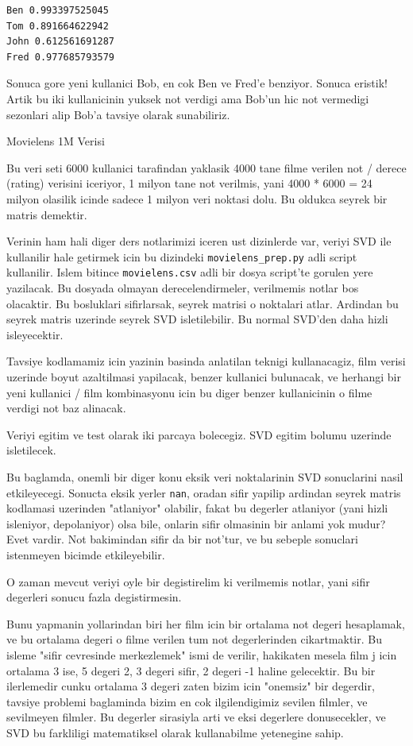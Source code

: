 \documentclass[12pt,fleqn]{article}\usepackage{../common}
\begin{document}
\begin{verbatim}
Ben 0.993397525045
Tom 0.891664622942
John 0.612561691287
Fred 0.977685793579
\end{verbatim}

Sonuca gore yeni kullanici Bob, en cok Ben ve Fred'e benziyor. Sonuca
eristik! Artik bu iki kullanicinin yuksek not verdigi ama Bob'un hic
not vermedigi sezonlari alip Bob'a tavsiye olarak sunabiliriz.

Movielens 1M Verisi

Bu veri seti 6000 kullanici tarafindan yaklasik 4000 tane filme
verilen not / derece (rating) verisini iceriyor, 1 milyon tane not
verilmis, yani 4000 * 6000 = 24 milyon olasilik icinde sadece 1 milyon
veri noktasi dolu. Bu oldukca seyrek bir matris demektir.

Verinin ham hali diger ders notlarimizi iceren ust dizinlerde var, veriyi
SVD ile kullanilir hale getirmek icin bu dizindeki \verb!movielens_prep.py!
adli script kullanilir. Islem bitince \verb!movielens.csv! adli bir dosya
script'te gorulen yere yazilacak. Bu dosyada olmayan derecelendirmeler,
verilmemis notlar bos olacaktir. Bu bosluklari sifirlarsak, seyrek matrisi
o noktalari atlar. Ardindan bu seyrek matris uzerinde seyrek SVD
isletilebilir. Bu normal SVD'den daha hizli isleyecektir.

Tavsiye kodlamamiz icin yazinin basinda anlatilan teknigi
kullanacagiz, film verisi uzerinde boyut azaltilmasi yapilacak, benzer
kullanici bulunacak, ve herhangi bir yeni kullanici / film
kombinasyonu icin bu diger benzer kullanicinin o filme verdigi not
baz alinacak. 

Veriyi egitim ve test olarak iki parcaya bolecegiz. SVD egitim bolumu
uzerinde isletilecek.

Bu baglamda, onemli bir diger konu eksik veri noktalarinin SVD
sonuclarini nasil etkileyecegi. Sonucta eksik yerler \verb!nan!,
oradan sifir yapilip ardindan seyrek matris kodlamasi uzerinden
"atlaniyor" olabilir, fakat bu degerler atlaniyor (yani hizli
isleniyor, depolaniyor) olsa bile, onlarin sifir olmasinin bir anlami
yok mudur? Evet vardir. Not bakimindan sifir da bir not'tur, ve bu
sebeple sonuclari istenmeyen bicimde etkileyebilir.

O zaman mevcut veriyi oyle bir degistirelim ki verilmemis notlar, yani
sifir degerleri sonucu fazla degistirmesin.

Bunu yapmanin yollarindan biri her film icin bir ortalama not degeri
hesaplamak, ve bu ortalama degeri o filme verilen tum not
degerlerinden cikartmaktir. Bu isleme "sifir cevresinde merkezlemek"
ismi de verilir, hakikaten mesela film j icin ortalama 3 ise, 5 degeri
2, 3 degeri sifir, 2 degeri -1 haline gelecektir. Bu bir ilerlemedir
cunku ortalama 3 degeri zaten bizim icin "onemsiz" bir degerdir,
tavsiye problemi baglaminda bizim en cok ilgilendigimiz sevilen
filmler, ve sevilmeyen filmler. Bu degerler sirasiyla arti ve eksi
degerlere donusecekler, ve SVD bu farkliligi matematiksel olarak
kullanabilme yetenegine sahip.
\end{document}
